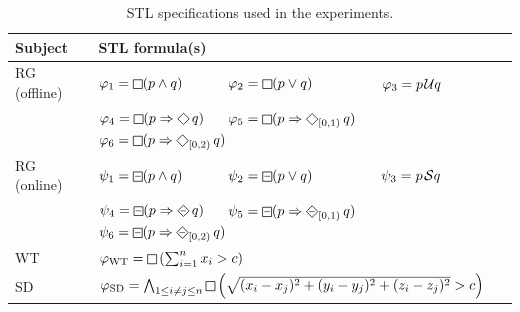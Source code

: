 \documentclass[iicol,lineno]{sn-jnl}
\renewcommand{\LTLf}{\LTLdiamond}
\renewcommand{\LTLg}{\LTLsquare}
\def\until{\kern.1em\mathcal{U}}
\def\since{\kern.1em\mathcal{S}}
\newcommand{\?}{\text{?}}
\begin{document}
	\begin{table}[t]
		\centering
			\begin{tabular}{|l|l|}
				\hline
				Subject & STL formula(s) \\
				\hline
				RG (offline) & $\varphi_1 =\LTLg (p \wedge q)$ \,\,\,\,\,\,\,\,\,\,\,\,\,\,\, $\varphi_2 =\LTLg (p \lor q)$ \,\,\,\,\,\,\,\,\,\,\,\,\,\,\,\,\,\,\,\,\,\,\,\,\, $\varphi_3 = p \until q$ \\
				& $\varphi_4 = \LTLg (p \Rightarrow \LTLf q)$  \,\,\,\,\,\,  $\varphi_5 = \LTLg (p \Rightarrow \LTLf_{[0,1)} q)$ \,\,\,\,\,\, $\varphi_6 = \LTLg (p \Rightarrow \LTLf_{[0,2)} q)$ \\
				RG (online) & $\psi_1 =\LTLsquareminus (p \wedge q)$ \,\,\,\,\,\,\,\,\,\,\,\,\,\,\, $\psi_2 =\LTLsquareminus (p \lor q)$ \,\,\,\,\,\,\,\,\,\,\,\,\,\,\,\,\,\,\,\,\,\,\,\,\, $\psi_3 = p \since q$ \\
				& $\psi_4 = \LTLsquareminus (p \Rightarrow \LTLdiamondminus q)$  \,\,\,\,\,\,  $\psi_5 = \LTLsquareminus (p \Rightarrow \LTLdiamondminus_{[0,1)} q)$ \,\,\,\,\,\, $\psi_6 = \LTLsquareminus (p \Rightarrow \LTLdiamondminus_{[0,2)} q)$ \\
				WT & $\varphi_{\text{WT}} = \LTLg \left(\sum_{i=1}^{n} x_i  > c\right)$  \\
				SD & $\varphi_{\text{SD}} = \bigwedge_{1 \leq i \neq j \leq n} \LTLg \left( \sqrt{(x_i-x_j)^2 + (y_i-y_j)^2 + (z_i-z_j)^2} > c \right)$   \\
				\hline
			\end{tabular}%
		\caption{STL specifications used in the experiments.}
		\label{tab:spec} 
	\end{table}
	
\end{document}
